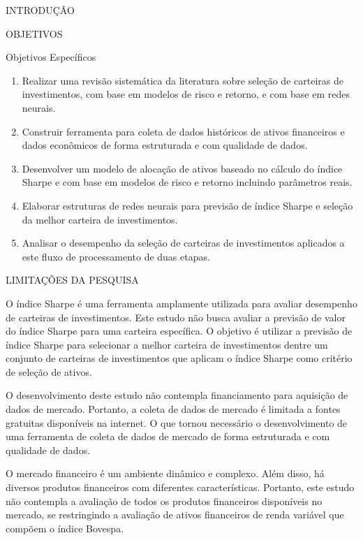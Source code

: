 \begin{section}{INTRODUÇÃO}
\begin{subsection}{OBJETIVOS}
        \begin{subsubsection}{Objetivos Específicos}
            \begin{enumerate}
                \item Realizar uma revisão sistemática da literatura sobre seleção de carteiras de investimentos, com base em modelos de risco e retorno, e com base em redes neurais.
                \item Construir ferramenta para coleta de dados históricos de ativos financeiros e dados econômicos de forma estruturada e com qualidade de dados.
                \item Desenvolver um modelo de alocação de ativos baseado no cálculo do índice Sharpe e com base em modelos de risco e retorno incluindo parâmetros reais.
                \item Elaborar estruturas de redes neurais para previsão de índice Sharpe e seleção da melhor carteira de investimentos.
                \item Analisar o desempenho da seleção de carteiras de investimentos aplicados a este fluxo de processamento de duas etapas. 
            \end{enumerate}

        \end{subsubsection}

    \end{subsection}

    
    \begin{subsection}{LIMITAÇÕES DA PESQUISA}
    
        \ipar O índice Sharpe é uma ferramenta amplamente utilizada para avaliar desempenho de carteiras de investimentos. Este estudo não busca avaliar a previsão de valor do índice Sharpe para uma carteira específica. O objetivo é utilizar a previsão de índice Sharpe para selecionar a melhor carteira de investimentos dentre um conjunto de carteiras de investimentos que aplicam o índice Sharpe como critério de seleção de ativos.

        \ipar O desenvolvimento deste estudo não contempla financiamento para aquisição de dados de mercado. Portanto, a coleta de dados de mercado é limitada a fontes gratuitas disponíveis na internet. O que tornou necessário o desenvolvimento de uma ferramenta de coleta de dados de mercado de forma estruturada e com qualidade de dados.

        \ipar O mercado financeiro é um ambiente dinâmico e complexo. Além disso, há diversos produtos financeiros com diferentes características. Portanto, este estudo não contempla a avaliação de todos os produtos financeiros disponíveis no mercado, se restringindo a avaliação de ativos financeiros de renda variável que compõem o índice Bovespa.


\end{subsection}
\end{section}
